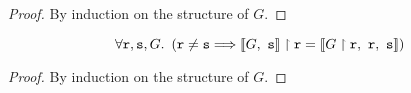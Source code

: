 \begin{proof}
By induction on the structure of $G$.
\end{proof}

\begin{lemma}

\[
\forall {\mathtt{r}}, {\mathtt{s}}, G. ~ \left(
{\mathtt{r}} \neq {\mathtt{s}} 
	\Longrightarrow
{ \llbracket {G},~ {\mathtt{s}}  \rrbracket } \upharpoonright {\mathtt{r}} = \llbracket { {G} \upharpoonright {\mathtt{r}}  },~{\mathtt{r}},~{\mathtt{s}} \rrbracket
\right)
\]

\label{lem:enclink}
\end{lemma}

\begin{proof}
By induction on the structure of $G$.

\end{proof}
